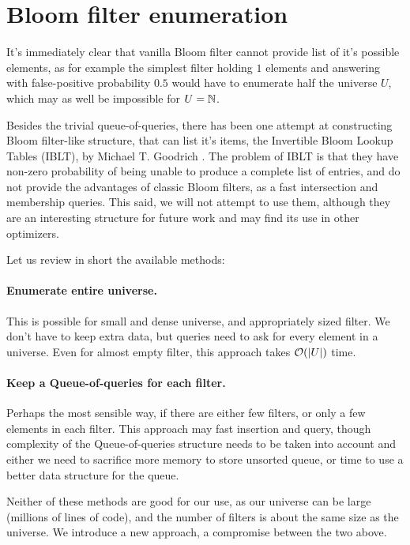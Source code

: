 \section{Bloom filter enumeration}

It's immediately clear that vanilla Bloom filter cannot provide list of it's
possible elements, as for example the simplest filter holding $1$ elements and
answering with false-positive probability $0.5$ would have to enumerate half the
universe $U$, which may as well be impossible for $U=\mathbb{N}$.

Besides the trivial queue-of-queries, there has been one attempt at constructing
Bloom filter-like structure, that can list it's items, the Invertible Bloom
Lookup Tables (IBLT), by Michael T. Goodrich \cite{goodrich:2011}. The problem of IBLT is
that they have non-zero probability of being unable to produce a complete list
of entries, and do not provide the advantages of classic Bloom filters, as a
fast intersection and membership queries. This said, we will not attempt to use
them, although they are an interesting structure for future work and may find
its use in other optimizers.

Let us review in short the available methods:

\paragraph{Enumerate entire universe.} This is possible for small and dense
universe, and appropriately sized filter. We don't have to keep extra data, but
queries need to ask for every element in a universe. Even for almost empty
filter, this approach takes $\mathcal{O}(|U|)$ time.

\paragraph{Keep a Queue-of-queries for each filter.} Perhaps the most sensible
way, if there are either few filters, or only a few elements in each filter.
This approach may fast insertion and query, though complexity of the
Queue-of-queries structure needs to be taken into account and either we need to
sacrifice more memory to store unsorted queue, or time to use a better data
structure for the queue.

Neither of these methods are good for our use, as our universe can be large
(millions of lines of code), and the number of filters is about the same size as
the universe. We introduce a new approach, a compromise between the two above.

